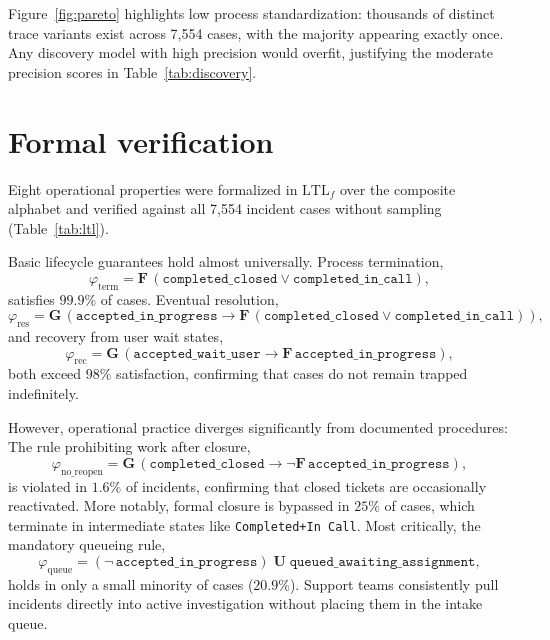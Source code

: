 \documentclass[12pt,a4paper]{article}
\newcommand{\act}[1]{\texttt{#1}}
\begin{document}
Figure~\ref{fig:pareto} highlights low process standardization: thousands of distinct trace variants exist across 7{,}554 cases, with the majority appearing exactly once. Any discovery model with high precision would overfit, justifying the moderate precision scores in Table~\ref{tab:discovery}.

\section{Formal verification}\label{sec:verification}

Eight operational properties were formalized in $\text{LTL}_f$ over the composite alphabet and verified against all 7{,}554 incident cases without sampling (Table~\ref{tab:ltl}).

\begin{table}[htbp]
\centering
\small

\caption{Temporal verification results over all 7{,}554 incident cases.}
\label{tab:ltl}
\end{table}

Basic lifecycle guarantees hold almost universally. Process termination,
\[
  \varphi_{\text{term}} = \mathbf{F}\,(\texttt{completed\_closed} \lor \texttt{completed\_in\_call}),
\]
satisfies $99.9\%$ of cases. Eventual resolution,
\[
  \varphi_{\text{res}} = \mathbf{G}\,(\texttt{accepted\_in\_progress} \rightarrow \mathbf{F}\,(\texttt{completed\_closed} \lor \texttt{completed\_in\_call})),
\]
and recovery from user wait states,
\[
  \varphi_{\text{rec}} = \mathbf{G}\,(\texttt{accepted\_wait\_user} \rightarrow \mathbf{F}\,\texttt{accepted\_in\_progress}),
\]
both exceed $98\%$ satisfaction, confirming that cases do not remain trapped indefinitely.

However, operational practice diverges significantly from documented procedures:
The rule prohibiting work after closure,
\[
  \varphi_{\text{no\_reopen}} = \mathbf{G}\,(\texttt{completed\_closed} \rightarrow \neg\mathbf{F}\,\texttt{accepted\_in\_progress}),
\]
is violated in $1.6\%$ of incidents, confirming that closed tickets are occasionally reactivated.
More notably, formal closure is bypassed in $25\%$ of cases, which terminate in intermediate states like \act{Completed+In Call}.
Most critically, the mandatory queueing rule,
\[
  \varphi_{\text{queue}} = (\neg\,\texttt{accepted\_in\_progress}) \;\mathbf{U}\; \texttt{queued\_awaiting\_assignment},
\]
holds in only a small minority of cases ($20.9\%$). Support teams consistently pull incidents directly into active investigation without placing them in the intake queue.
\end{document}
